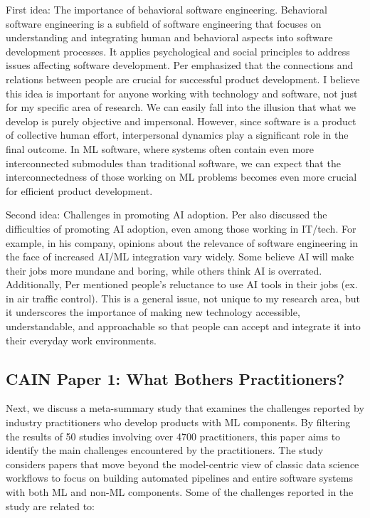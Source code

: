 \documentclass[11pt]{article}
\begin{document}
First idea: The importance of behavioral software engineering. Behavioral software engineering is a subfield of software engineering that focuses on understanding and integrating human and behavioral aspects into software development processes. It applies psychological and social principles to address issues affecting software development. Per emphasized that the connections and relations between people are crucial for successful product development. I believe this idea is important for anyone working with technology and software, not just for my specific area of research. We can easily fall into the illusion that what we develop is purely objective and impersonal. However, since software is a product of collective human effort, interpersonal dynamics play a significant role in the final outcome. In ML software, where systems often contain even more interconnected submodules than traditional software, we can expect that the interconnectedness of those working on ML problems becomes even more crucial for efficient product development.

Second idea: Challenges in promoting AI adoption. Per also discussed the difficulties of promoting AI adoption, even among those working in IT/tech. For example, in his company, opinions about the relevance of software engineering in the face of increased AI/ML integration vary widely. Some believe AI will make their jobs more mundane and boring, while others think AI is overrated. Additionally, Per mentioned people's reluctance to use AI tools in their jobs (ex. in air traffic control). This is a general issue, not unique to my research area, but it underscores the importance of making new technology accessible, understandable, and approachable so that people can accept and integrate it into their everyday work environments.






\subsection*{CAIN Paper 1: What Bothers Practitioners? \cite{nahar2023meta}}

Next, we discuss a meta-summary study \cite{nahar2023meta} that examines the challenges reported by industry practitioners who develop products with ML components. By filtering the results of 50 studies involving over 4700 practitioners, this paper aims to identify the main challenges encountered by the practitioners. The study considers papers that move beyond the model-centric view of classic data science workflows to focus on building automated pipelines and entire software systems with both ML and non-ML components. Some of the challenges reported in the study are related to: 
\end{document}
